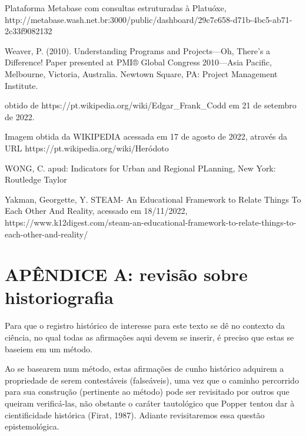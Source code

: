 \begin{flushleft}
[WASH, 2023] Plataforma Metabase com consultas estruturadas à Platuóxe, http://metabase.wash.net.br:3000/public/dashboard/29c7c658-d71b-4bc5-ab71-2c33f9082132
\end{flushleft}


\begin{flushleft}
[Weaver, 2010] Weaver, P. (2010). Understanding Programs and Projects—Oh, There's a Difference! Paper presented at PMI® Global Congress 2010—Asia Pacific, Melbourne, Victoria, Australia. Newtown Square, PA: Project Management Institute.
\end{flushleft}


\begin{flushleft}
 obtido de https://pt.wikipedia.org/wiki/Edgar\_Frank\_Codd em 21 de setembro de 2022.
\end{flushleft}


\begin{flushleft}
[WIKIPEDIA, 2022] Imagem obtida da WIKIPEDIA acessada em 17 de agosto de 2022, através da URL https://pt.wikipedia.org/wiki/Heródoto
\end{flushleft}


\begin{flushleft}
[WONG, 2006] WONG, C. apud: Indicators for Urban and Regional PLanning, New York: Routledge Taylor 
\end{flushleft}


\begin{flushleft}
[YAKMAN, 2019] Yakman, Georgette, Y. STEAM- An Educational Framework to Relate Things To Each Other And Reality, acessado em 18/11/2022, https://www.k12digest.com/steam-an-educational-framework-to-relate-things-to-each-other-and-reality/
\end{flushleft}


\chapter[APÊNDICE A: revisão sobre historiografia]{APÊNDICE A: revisão sobre historiografia}\label{APÊNDICE A: revisão sobre historiografia}
Para que o registro histórico de interesse para este texto se dê no contexto da ciência, no qual todas as afirmações aqui devem se inserir, é preciso que estas se baseiem em um método.

Ao se basearem num método, estas afirmações de cunho histórico adquirem a propriedade de serem contestáveis (falseáveis), uma vez que o caminho percorrido para sua construção (pertinente ao método) pode ser revisitado por outros que queiram verificá-las, não obstante o caráter tautológico que Popper tentou dar à cientificidade histórica  (Firat, 1987). Adiante revisitaremos essa questão epistemológica.

